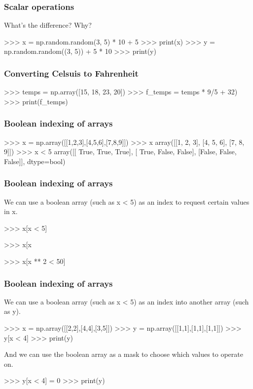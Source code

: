 \documentclass{beamer}
\begin{document}
\begin{frame}[fragile]
\frametitle{Scalar operations}
What's the difference? Why?
\begin{code}
>>> x = np.random.random(3, 5) * 10 + 5
>>> print(x)
>>> y = np.random.random((3, 5)) + 5 * 10
>>> print(y)
\end{code}
\end{frame}

\begin{frame}[fragile]
\frametitle{Converting Celsuis to Fahrenheit}
\begin{code}
>>> temps = np.array([15, 18, 23, 20])
>>> f_temps = temps * 9/5 + 32)
>>> print(f_temps)
\end{code}
\end{frame}



\begin{frame}[fragile]
\frametitle{Boolean indexing of arrays}
\begin{code}
>>> x = np.array([[1,2,3],[4,5,6],[7,8,9]])
>>> x
array([[1, 2, 3],
       [4, 5, 6],
       [7, 8, 9]])
>>> x < 5
array([[ True,  True,  True],
       [ True, False, False],
       [False, False, False]], dtype=bool)
\end{code}
\end{frame}

\begin{frame}[fragile]
\frametitle{Boolean indexing of arrays}
We can use a boolean array (such as x < 5) as an index to request
certain values in x.
\begin{code}
>>> x[x < 5]

>>> x[x %

>>> x[x ** 2 < 50]
\end{code}
\end{frame}

\begin{frame}[fragile]
\frametitle{Boolean indexing of arrays}
We can use a boolean array (such as x < 5) as an index into another
array (such as y).
\begin{code}
>>> x = np.array([[2,2],[4,4],[3,5]])
>>> y = np.array([[1,1],[1,1],[1,1]])
>>> y[x < 4]
>>> print(y)
\end{code}

And we can use the boolean array as a mask to choose which values to
operate on.
\begin{code}
>>> y[x < 4] = 0
>>> print(y)
\end{code}
\end{frame}
\end{document}
